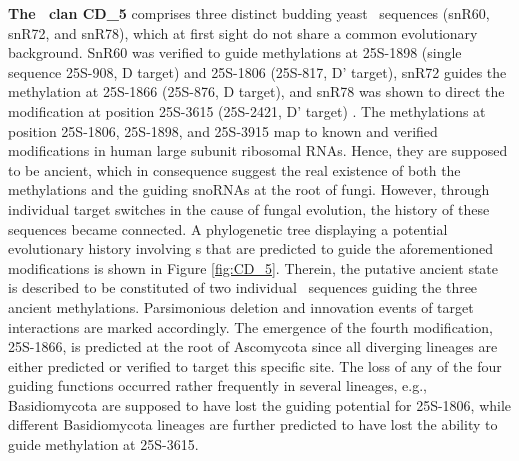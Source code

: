 \textbf{The \sno\ clan CD\_5} comprises three distinct budding yeast
\sno\ sequences (snR60, snR72, and snR78), which at first sight do not
share a common evolutionary background. SnR60 was verified to guide
methylations at 25S-1898 (single sequence 25S-908, D target) and
25S-1806 (25S-817, D' target), snR72 guides the methylation at
25S-1866 (25S-876, D target), and snR78 was shown to direct the
modification at position 25S-3615 (25S-2421, D' target)
\cite{Lowe:1999}. The methylations at position 25S-1806, 25S-1898, and
25S-3915 map to known and verified modifications in human large
subunit ribosomal RNAs. Hence, they are supposed to be ancient, which in
consequence suggest the real existence of both the methylations and
the guiding snoRNAs at the root of fungi.  However, through individual
target switches in the cause of fungal evolution, the history of these
sequences became connected. A phylogenetic tree displaying a potential
evolutionary history involving \sno s that are predicted to guide the
aforementioned modifications is shown in Figure
\ref{fig:CD_5}. Therein, the putative ancient state is described to be
constituted of two individual \sno\ sequences guiding the three
ancient methylations.  Parsimonious deletion and innovation events of
target interactions are marked accordingly. The emergence of the
fourth modification, 25S-1866, is predicted at the root of Ascomycota
since all diverging lineages are either predicted or verified to
target this specific site. The loss of any of the four guiding
functions occurred rather frequently in several lineages, e.g.,
Basidiomycota are supposed to have lost the guiding potential for
25S-1806, while different Basidiomycota lineages are further predicted
to have lost the ability to guide methylation at 25S-3615.

